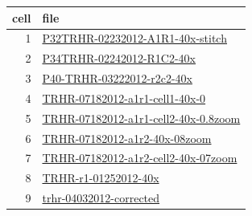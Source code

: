 \documentclass{article}
\begin{document}
\clearpage

\begin{figure}
  \centering
  \caption{}
\end{figure}

\begin{table}
  \centering
  \begin{tabular}{rl}
    \toprule
    cell & file \\
    \midrule
1& \url{P32TRHR-02232012-A1R1-40x-stitch} \\
2& \url{P34TRHR-02242012-R1C2-40x} \\
3& \url{P40-TRHR-03222012-r2c2-40x} \\
4& \url{TRHR-07182012-a1r1-cell1-40x-0} \\
5& \url{TRHR-07182012-a1r1-cell2-40x-0.8zoom} \\
6& \url{TRHR-07182012-a1r2-40x-08zoom} \\
7& \url{TRHR-07182012-a1r2-cell2-40x-07zoom} \\
8& \url{TRHR-r1-01252012-40x} \\
9& \url{trhr-04032012-corrected} \\
\bottomrule
  \end{tabular}
\end{table}


\clearpage



\begin{figure}
  \centering
  \caption{}
\end{figure}
\end{document}
